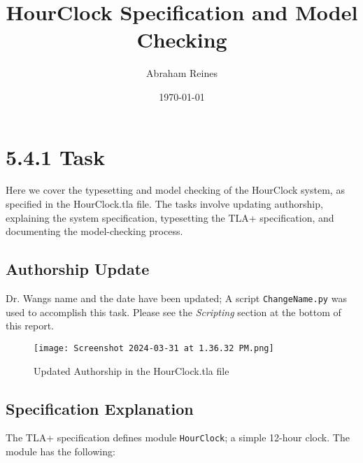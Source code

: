 \documentclass{article}
\title{HourClock Specification and Model Checking}
\author{Abraham Reines} %
\date{\today} %
\begin{document}
\maketitle

\section*{5.4.1 Task}
Here we cover the typesetting and model checking of the HourClock system, as specified in the HourClock.tla file. The tasks involve updating authorship, explaining the system specification, typesetting the TLA+ specification, and documenting the model-checking process.

\subsection*{Authorship Update}
Dr. Wangs name and the date have been updated; A script \texttt{ChangeName.py} was used to accomplish this task. Please see the \textit{Scripting} section at the bottom of this report. 
 


\begin{figure}[H]
\centering
\texttt{[image: Screenshot 2024-03-31 at 1.36.32 PM.png]}
\caption{Updated Authorship in the HourClock.tla file}
\end{figure}

\subsection*{Specification Explanation}
The TLA+ specification defines module \texttt{HourClock}; a simple 12-hour clock. The module has the following:
\end{document}
